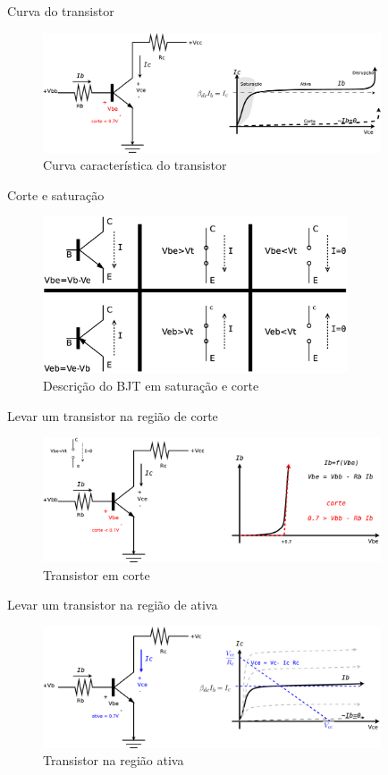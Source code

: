 \documentclass[envcountsect,dvips]{beamer}
\begin{document}
\begin{frame}{Curva do transistor}
\begin{figure}
\centering
\includegraphics[width=10cm]{images/emisorcomun.eps}
\caption{Curva característica do transistor}
\label{fig:emisorcomun}
\end{figure}
\end{frame}

\begin{frame}{Corte e saturação }
\begin{figure}
\centering
\includegraphics[width=9cm]{images/simple.eps}
\caption{Descrição  do BJT em saturação e corte}
\label{fig:simples2}
\end{figure}
\end{frame}

\begin{frame}{Levar um transistor na região de corte}
\begin{figure}
\centering
\includegraphics[width=10cm]{images/emisorcomun1.eps}
\caption{Transistor em corte}
\label{fig:emisorcomun1}
\end{figure}
\end{frame}

\begin{frame}{Levar um transistor na região de ativa}
\begin{figure}
\centering
\includegraphics[width=10cm]{images/emisorcomun2.eps}
\caption{Transistor na região ativa}
\label{fig:emisorcomun2}
\end{figure}
\end{frame}
\end{document}
